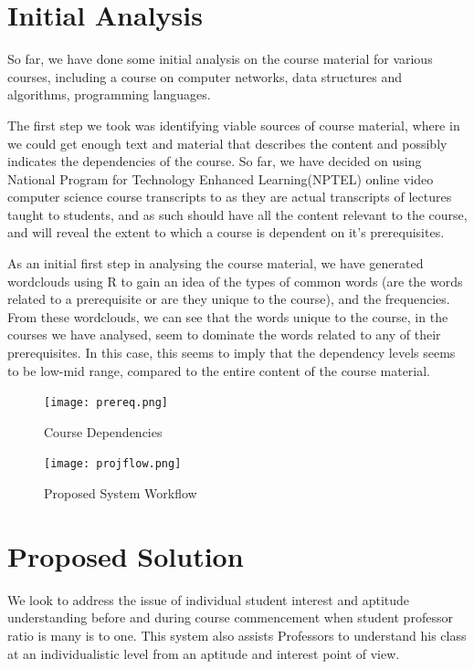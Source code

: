 \documentclass[conference]{IEEEtran}
\begin{document}
	\section{Initial Analysis}
So far, we have done some initial analysis on the course material for various courses, including a course on computer networks, data structures and algorithms, programming languages.

The first step we took was identifying viable sources of course material, where in we could get enough text and material that describes the content and possibly indicates the dependencies of the course. So far, we have decided on using National Program for Technology Enhanced Learning(NPTEL)\cite{nptel} online video computer science course transcripts to as they are actual transcripts of lectures taught to students, and as such should have all the content relevant to the course, and will reveal the extent to which a course is dependent on it's prerequisites.

As an initial first step in analysing the course material, we have generated wordclouds using R\cite{r} to gain an idea of the types of common words (are the words related to a prerequisite or are they unique to the course), and the frequencies. From these wordclouds, we can see that the words unique to the course, in the courses we have analysed, seem to dominate the words related to any of their prerequisites. In this case, this seems to imply that the dependency levels seems to be low-mid range, compared to the entire content of the course material.

\begin{figure}
	\texttt{[image: prereq.png]}
	\caption{Course Dependencies}
	\label{fig:prereq}
\end{figure}
\begin{figure}
	\texttt{[image: projflow.png]}
	\caption{Proposed System Workflow}
	\label{fig:projflow}
\end{figure}

	\section{Proposed Solution}
We look to address the issue of individual student interest and aptitude understanding before and during course commencement when student professor ratio is many is to one. This system also assists Professors to understand his class at an individualistic level from an aptitude and interest point of view. 
\end{document}
